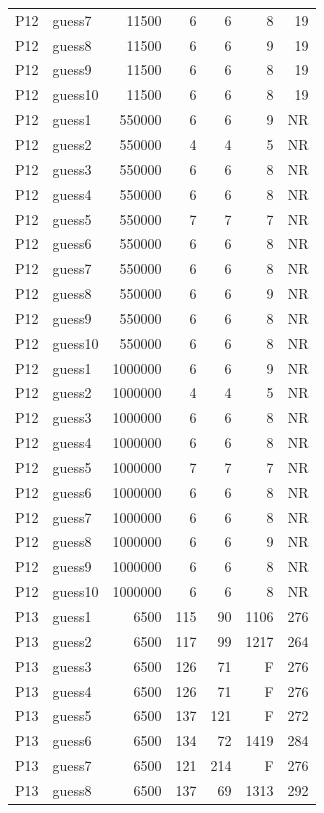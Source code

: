 {\begin{longtable}{llrrrrr}
P12 & guess7 & 11500 & 6 & 6 & 8 & 19 \\
P12 & guess8 & 11500 & 6 & 6 & 9 & 19 \\
P12 & guess9 & 11500 & 6 & 6 & 8 & 19 \\
P12 & guess10 & 11500 & 6 & 6 & 8 & 19 \\
P12 & guess1 & 550000 & 6 & 6 & 9 & NR \\
P12 & guess2 & 550000 & 4 & 4 & 5 & NR \\
P12 & guess3 & 550000 & 6 & 6 & 8 & NR \\
P12 & guess4 & 550000 & 6 & 6 & 8 & NR \\
P12 & guess5 & 550000 & 7 & 7 & 7 & NR \\
P12 & guess6 & 550000 & 6 & 6 & 8 & NR \\
P12 & guess7 & 550000 & 6 & 6 & 8 & NR \\
P12 & guess8 & 550000 & 6 & 6 & 9 & NR \\
P12 & guess9 & 550000 & 6 & 6 & 8 & NR \\
P12 & guess10 & 550000 & 6 & 6 & 8 & NR \\
P12 & guess1 & 1000000 & 6 & 6 & 9 & NR \\
P12 & guess2 & 1000000 & 4 & 4 & 5 & NR \\
P12 & guess3 & 1000000 & 6 & 6 & 8 & NR \\
P12 & guess4 & 1000000 & 6 & 6 & 8 & NR \\
P12 & guess5 & 1000000 & 7 & 7 & 7 & NR \\
P12 & guess6 & 1000000 & 6 & 6 & 8 & NR \\
P12 & guess7 & 1000000 & 6 & 6 & 8 & NR \\
P12 & guess8 & 1000000 & 6 & 6 & 9 & NR \\
P12 & guess9 & 1000000 & 6 & 6 & 8 & NR \\
P12 & guess10 & 1000000 & 6 & 6 & 8 & NR \\
P13 & guess1 & 6500 & 115 & 90 & 1106 & 276 \\
P13 & guess2 & 6500 & 117 & 99 & 1217 & 264 \\
P13 & guess3 & 6500 & 126 & 71 & F & 276 \\
P13 & guess4 & 6500 & 126 & 71 & F & 276 \\
P13 & guess5 & 6500 & 137 & 121 & F & 272 \\
P13 & guess6 & 6500 & 134 & 72 & 1419 & 284 \\
P13 & guess7 & 6500 & 121 & 214 & F & 276 \\
P13 & guess8 & 6500 & 137 & 69 & 1313 & 292 \\

\end{longtable}}
